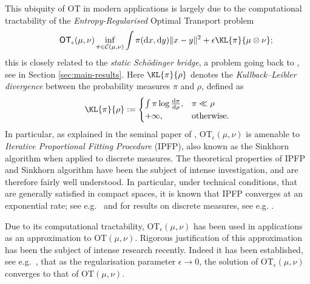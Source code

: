 \documentclass[11pt,a4paper]{article}
\providecommand{\DIFaddbegin}{} %
\providecommand{\DIFaddend}{} %
\providecommand{\DIFdelbegin}{} %
\providecommand{\DIFdelend}{} %
\begin{document}
This ubiquity of OT in modern applications is largely due to the computational tractability of the \emph{Entropy-Regularised} Optimal Transport problem
\begin{equation}
    \label{eq:RegOTproblem}\tag*{\textsf{OT}$_\epsilon(\mu,\nu)$}
    \inf_{\pi \in \mathcal{C}(\mu, \nu)} \int \DIFdelbegin %
\DIFdelend \pi(\DIFaddbegin \rmd \DIFaddend x, \DIFaddbegin \rmd \DIFaddend y) \|x-y\|^2 +\epsilon \KL{\pi}{\mu\otimes \nu};
\end{equation}
this is closely related to the \emph{static Sch\"odinger bridge},
a problem going back to \cite{schrodinger1931umkehrung}, see  in Section \ref{sec:main-results}.   
Here $\KL{\pi}{\rho}$ denotes the \emph{Kullback--Leibler divergence} between the probability measures $\pi$ and $\rho$, defined as 
\begin{equation}
\KL{\pi}{\rho} := \DIFdelbegin %
\DIFdelend \DIFaddbegin \begin{cases}
                        \int \pi \log \frac{\rmd \pi}{\rmd \rho}, & \pi \ll \rho\\
                        +\infty, & \text{otherwise}.
                        \end{cases}\DIFaddend 
 \end{equation}
In particular, as explained in the seminal paper of \cite{cuturi2013sinkhorn}, \textsf{OT}$_\epsilon(\mu,\nu)$
is amenable to \emph{Iterative Proportional Fitting Procedure} (IPFP), also known as the Sinkhorn algorithm when applied to discrete measures. The theoretical properties of IPFP and Sinkhorn algorithm have been the subject of intense investigation, and are therefore fairly well understood. In particular, under technical conditions, that are generally satisfied in compact spaces, it is known that IPFP converges at an exponential rate; see e.g.\ \cite{ruschendorf1995convergence} and for results on discrete measures, see e.g. \cite{altschuler2017near}.

Due to its computational tractability, \textsf{OT}$_\epsilon(\mu,\nu)$ has been used in applications as an approximation to \textsf{OT}$(\mu,\nu)$. Rigorous justification of this approximation has been the subject of intense research recently. Indeed it has been established, see e.g.\  \cite{cominetti1994asymptotic,leonard2012schrodinger,carlier2017convergence}, that as the regularisation parameter $\epsilon \to 0$, the solution of \textsf{OT}$_\epsilon(\mu,\nu)$ converges to that of \textsf{OT}$(\mu,\nu)$.
\end{document}
